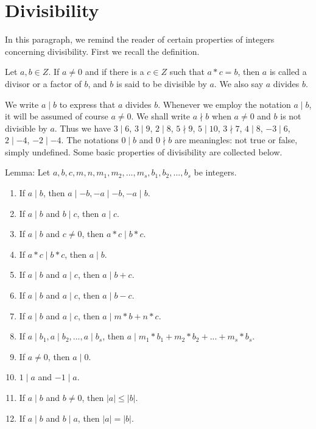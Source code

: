 \documentclass[11pt]{amsbook}
\begin{document}

\section{Divisibility}

In this paragraph, we remind the reader of certain properties of integers concerning divisibility. First we recall the definition.
\begin{cor}
Let  $a,b \in Z$. If $a \neq 0$ and if there is \textnormal{a} $c \in Z$ such that $a*c = b$, then $a$ is called \textnormal{a} divisor or \textnormal{a} factor of $b$, and $b$ is said to be divisible by $a$. We also say $a$ divides $b$.
\end{cor}

We write $a	\mid	 b $ to express that $a$ divides $b$. Whenever we employ the notation $a	\mid	 b$, it will be assumed of course $a\neq 0$. We shall write $a \nmid b$ 	when $a \neq 0$ and $b$ is not divisible by $a$. Thus we have 
$3 \mid 6$, $3 \mid 9$, $2 \mid 8$, $5 \nmid 9$, $5 \mid 10$, 
$3 \nmid 7$, $4 \mid 8$, $-3 \mid 6$, $2 \mid -4$, $-2 \mid -4$.   
The notations $0 \mid b$ and $0 \nmid b$ are meaningles: not true or false, simply undefined.
Some basic properties of divisibility are collected below.

\begin{cor} Lemma: Let \(a,b,c,m,n,m_1,m_2,..., m_s,b_1,b_2,...,b_s \) be integers.

\begin{enumerate}[label={\arabic*.}]

  \item If $a \mid b$, then \( a \mid -b, -a \mid -b, -a \mid b \).
  \item If $a \mid b$ and $b \mid c$, then $a \mid c$.
  \item If $a \mid b$ and $c \neq 0$, then $a*c \mid b*c$.
  \item If  $a*c \mid b*c$, then $a \mid b$.
  \item If $a \mid b$ and $a \mid c$, then $a \mid b + c$.
  \item If $a \mid b$ and $a \mid c$, then $a \mid b - c$.
  \item If $a \mid b$ and $a \mid c$, then $a \mid m*b + n*c$.
  \item If \(a \mid b_1, a \mid b_2,..., a \mid b_s\), then  \(a \mid m_1*b_1 + m_2*b_2 + ... + m_s*b_s\).
  \item If $a \neq 0$, then $a \mid 0$.
  \item $1 \mid a$ and $-1 \mid a$.
  \item If $a \mid b$ and $b \neq 0$, then $|a| \leq |b|$.
  \item If $a \mid b$ and $b \mid a$, then $|a| = |b|$.
\end{enumerate}
\end{cor}
\end{document}
